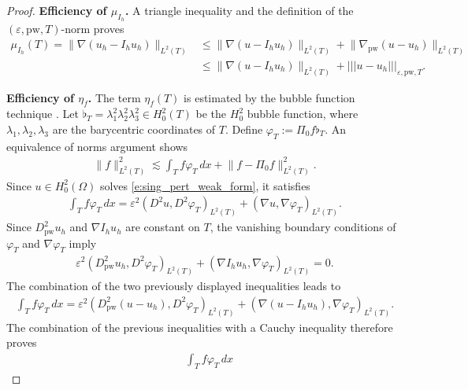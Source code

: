 \documentclass[a4paper]{amsart}
\theoremstyle{definition}
\numberwithin{equation}{section}
\numberwithin{theorem}{section}
\newcommand{\pw}{\mathrm{pw}}
\newcommand{\ennorm}[1]{\lvert\!\lvert\!\lvert #1 \rvert\!\rvert\!\rvert}
\begin{document}
\begin{proof}
    \textbf{Efficiency of $\mu_{I_h}$.}
    A triangle inequality and the definition of the 
    $(\varepsilon,\pw,T)$-norm 
    proves 
    \begin{align*}
    \mu_{I_h}(T)=
        \lVert\nabla(u_h-I_h u_h)\rVert_{L^2(T)}
        &\leq \lVert\nabla(u-I_h u_h)\rVert_{L^2(T)}
           + \lVert\nabla_\pw(u-u_h)\rVert_{L^2(T)}\\
        &\leq \lVert\nabla(u-I_h u_h)\rVert_{L^2(T)}
            + \ennorm{u-u_h}_{\varepsilon,\pw,T}.
    \end{align*}
    
    \textbf{Efficiency of $\eta_f$.}
    The term $\eta_f(T)$ is estimated by the bubble function
    technique \cite{Verfuerth2013}.
    Let $\flat_T=\lambda_1^2\lambda_2^2\lambda_3^2\in H^2_0(T)$ 
    be the $H^2_0$ bubble function, where $\lambda_1,\lambda_2,\lambda_3$
    are the barycentric coordinates of $T$.
    Define $\varphi_T:=\Pi_0 f \flat_T$.
    An equivalence of norms argument shows
    \begin{align*}
        \lVert f\rVert_{L^2(T)}^2
        \lesssim \int_T f \varphi_T\,dx 
           + \lVert f-\Pi_0 f\rVert_{L^2(T)}^2.
    \end{align*}
    Since $u\in H^2_0(\Omega)$ solves \eqref{e:sing_pert_weak_form},
    it satisfies 
    \begin{align*}
        \int_T f \varphi_T\,dx
        = \varepsilon^2 (D^2 u, D^2 \varphi_T)_{L^2(T)} 
          + (\nabla u,\nabla \varphi_T)_{L^2(T)}.
    \end{align*}
    Since $D^2_\pw u_h$ and $\nabla I_h u_h$ are constant on $T$,
    the vanishing boundary conditions of $\varphi_T$ and $\nabla \varphi_T$ 
    imply 
    \begin{align*}
        \varepsilon^2 (D^2_\pw u_h, D^2 \varphi_T)_{L^2(T)} 
          + (\nabla I_h u_h,\nabla \varphi_T)_{L^2(T)}=0.
    \end{align*}
    The combination of the two previously displayed inequalities 
    leads to 
    \begin{align*}
        \int_T f \varphi_T\,dx
        = \varepsilon^2 (D^2_\pw (u-u_h), D^2 \varphi_T)_{L^2(T)} 
          + (\nabla (u-I_h u_h),\nabla \varphi_T)_{L^2(T)}.
    \end{align*}
    The combination of the previous inequalities with 
    a Cauchy inequality therefore proves 
    \begin{align*}
        &\int_T f \varphi_T\,dx%

\end{align*}
\end{proof}
\end{document}
